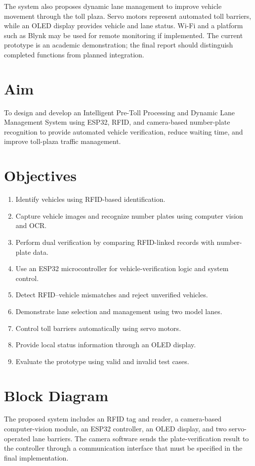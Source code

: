 \documentclass[12pt,a4paper]{report}
\begin{document}
The system also proposes dynamic lane management to improve vehicle movement
through the toll plaza. Servo motors represent automated toll barriers, while an OLED
display provides vehicle and lane status. Wi-Fi and a platform such as Blynk may be
used for remote monitoring if implemented. The current prototype is an academic
demonstration; the final report should distinguish completed functions from planned
integration.

\section{Aim}
To design and develop an Intelligent Pre-Toll Processing and Dynamic Lane Management
System using ESP32, RFID, and camera-based number-plate recognition to provide
automated vehicle verification, reduce waiting time, and improve toll-plaza traffic
management.

\section{Objectives}
\begin{enumerate}
\item Identify vehicles using RFID-based identification.
\item Capture vehicle images and recognize number plates using computer vision and OCR.
\item Perform dual verification by comparing RFID-linked records with number-plate data.
\item Use an ESP32 microcontroller for vehicle-verification logic and system control.
\item Detect RFID--vehicle mismatches and reject unverified vehicles.
\item Demonstrate lane selection and management using two model lanes.
\item Control toll barriers automatically using servo motors.
\item Provide local status information through an OLED display.
\item Evaluate the prototype using valid and invalid test cases.
\end{enumerate}

\section{Block Diagram}
The proposed system includes an RFID tag and reader, a camera-based computer-vision
module, an ESP32 controller, an OLED display, and two servo-operated lane barriers.
The camera software sends the plate-verification result to the controller through a
communication interface that must be specified in the final implementation.
\end{document}

